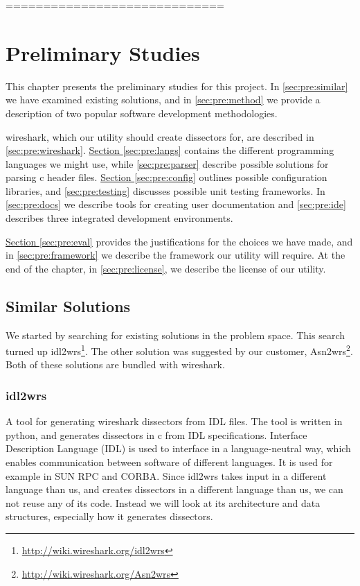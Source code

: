 =============================
\chapter{Preliminary Studies}
This chapter presents the preliminary studies for this project.
In \autoref{sec:pre:similar} we have examined existing solutions, and in
\autoref{sec:pre:method} we provide a description of two popular software
development methodologies.

\Gls{wireshark}, which our \gls{utility} should create \glspl{dissector} for, are described in
\autoref{sec:pre:wireshark}.
\hyperref[sec:pre:langs]{Section \ref*{sec:pre:langs}} contains the different
programming languages we might use, while \autoref{sec:pre:parser}
describe possible solutions for parsing \Gls{c} \gls{header} files.
\hyperref[sec:pre:config]{Section \ref*{sec:pre:config}} outlines possible
configuration libraries, and \autoref{sec:pre:testing} discusses possible unit
testing frameworks. In \autoref{sec:pre:docs} we describe tools for creating
user documentation and \autoref{sec:pre:ide} describes three integrated
development environments.

\hyperref[sec:pre:eval]{Section \ref*{sec:pre:eval}} provides the
justifications for the choices we have made, and in
\autoref{sec:pre:framework} we describe the framework our \gls{utility} will require.
At the end of the chapter, in \autoref{sec:pre:license}, we describe the
license of our \gls{utility}.


\section{Similar Solutions}
\label{sec:pre:similar}
We started by searching for existing solutions in the problem space. This
search turned up idl2wrs\footnote{\url{http://wiki.wireshark.org/idl2wrs}}.
The other solution was suggested by our customer,
Asn2wrs\footnote{\url{http://wiki.wireshark.org/Asn2wrs}}.
Both of these solutions are bundled with \Gls{wireshark}.

\subsection{idl2wrs}
A tool for generating \Gls{wireshark} \glspl{dissector} from IDL files. The tool is written
in \Gls{python}, and generates \glspl{dissector} in \Gls{c} from IDL specifications. Interface
Description Language (IDL) is used to interface in a language-neutral way,
which enables communication between software of different languages. It is
used for example in SUN RPC and CORBA. Since idl2wrs takes input in a different
language than us, and creates \glspl{dissector} in a different language than us, we
can not reuse any of its code. Instead we will look at its architecture and
data structures, especially how it generates \glspl{dissector}.

